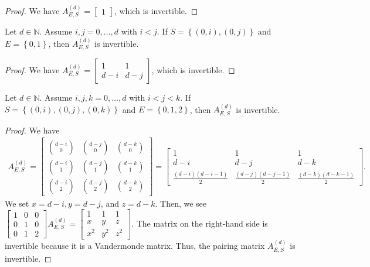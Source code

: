 \begin{proof}
    We have \( A^{(d)}_{E,S} = \begin{bmatrix}
        1
    \end{bmatrix} \), which is invertible.
\end{proof}

\begin{proposition}\label{prop:impossible-support-232423}
    Let \( d \in \mathbb{N} \). Assume \( i,j=0, \dots, d \) with \( i < j \). If \( S = \left\{ (0,i), (0,j) \right\} \) and \( E = \left\{ 0,1 \right\} \), then \( A^{(d)}_{E,S} \) is invertible.
\end{proposition}

\begin{proof}
    We have \( A^{(d)}_{E,S} = \begin{bmatrix}
        1 & 1 \\ d-i & d-j
    \end{bmatrix} \), which is invertible.
\end{proof}

\begin{proposition}\label{prop:impossible-support-2}
    Let \( d \in \mathbb{N} \). Assume \( i,j,k=0, \dots, d \) with \( i < j < k \). If \( S = \left\{ (0,i), (0,j), (0,k) \right\} \) and \( E = \left\{ 0,1,2 \right\} \), then \( A^{(d)}_{E,S} \) is invertible.
\end{proposition}

\begin{proof}
    We have 
    \begin{align*}
        A^{(d)}_{E,S} = \begin{bmatrix}
            \binom{d-i}{0} & \binom{d-j}{0} & \binom{d-k}{0} \\
            \binom{d-i}{1} & \binom{d-j}{1} & \binom{d-k}{1} \\
            \binom{d-i}{2} & \binom{d-j}{2} & \binom{d-k}{2}
        \end{bmatrix} = \begin{bmatrix}
            1 & 1 & 1 \\
            d-i & d-j & d-k \\
            \frac{(d-i)(d-i-1)}{2} & \frac{(d-j)(d-j-1)}{2} & \frac{(d-k)(d-k-1)}{2}
        \end{bmatrix}.
    \end{align*}
    We set \( x = d-i, y = d-j \), and \( z = d-k \).
    Then, we see \( \begin{bmatrix}
        1 & 0 & 0 \\
        0 & 1 & 0 \\
        0 & 1 & 2
    \end{bmatrix}A^{(d)}_{E,S} = \begin{bmatrix}
        1 & 1 & 1 \\
        x & y & z \\
        x^2 & y^2 & z^2
    \end{bmatrix} \).
    The matrix on the right-hand side is invertible because it is a Vandermonde matrix. Thus, the pairing matrix \( A^{(d)}_{E,S} \) is invertible.
\end{proof}


